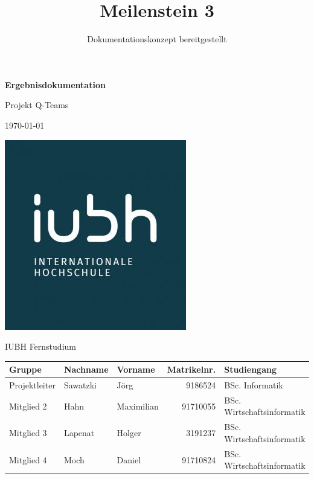 \documentclass[a4paper,11pt,listof=numbered,glossary=totoc,parskip=half,toc=bib]{scrreprt}
\title{Meilenstein 3}
\subtitle{Dokumentationskonzept bereitgestellt}
\begin{document}
	\begin{titlepage}
		
		\centering
		\vspace*{2.5cm}
		{\large\bfseries \par}	
		{\Huge\bfseries Ergebnisdokumentation\par}
		{\Large\bfseries  \par}

		{\Large Projekt Q-Teams\par}
		{\large\today\par}
		\vspace{0.5cm}

			
		
		\includegraphics[scale=0.5]{iubh_logo}
		
		IUBH Fernstudium
		\vspace{0.5cm}
		
		\begin{tabular}{lllrl}
			\toprule
			\textbf{Gruppe} & \textbf{Nachname} & \textbf{Vorname} & \textbf{Matrikelnr.} & \textbf{Studiengang} \\
			\midrule
			Projektleiter & Sawatzki & Jörg & 9186524 & BSc. Informatik \\
			Mitglied 2 & Hahn & Maximilian & 91710055 & BSc. Wirtschaftsinformatik \\
			Mitglied 3 & Lapenat & Holger & 3191237 & BSc. Wirtschaftsinformatik \\
			Mitglied 4 & Moch & Daniel & 91710824 & BSc. Wirtschaftsinformatik \\
			\bottomrule
		\end{tabular}	
	\end{titlepage}
	
	
	\newpage
	\setcounter{tocdepth}{2}
	\tableofcontents	
	\renewcommand \thechapter{\Roman{chapter}}
	\listoffigures %
	\printglossaries
	\setcounter{lastRomanCounter}{\value{chapter}} %
	
\end{document}
